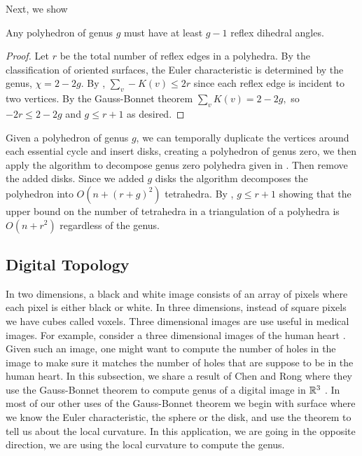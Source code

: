 Next, we show
\begin{theorem}\label{thm:reflex}

Any polyhedron of genus $g$ must have 
at least $g-1$ reflex dihedral angles. 

\end{theorem}
\begin{proof}
Let $r$ be the total number of reflex edges in a polyhedra.
By the classification of oriented surfaces, the Euler characteristic 
 is determined by the genus, $\chi=2-2g$.
By , $\sum_v -K(v)\leq 2 r$ since each
reflex edge is incident to two vertices.
By the Gauss-Bonnet theorem $\sum_vK(v)= 2-2g,$
so $-2r\leq 2-2g$ and $g\leq r+1$ as desired.

\end{proof}

Given a polyhedron of genus $g$, we can temporally 
duplicate the vertices around each essential cycle and insert disks,
 creating a polyhedron of genus zero, we then apply the algorithm to
decompose genus zero polyhedra given in \cite{triangulating-polytope-1990}.
Then remove the added disks.
Since we added $g$ disks the algorithm decomposes
the polyhedron into $O(n+ (r+g)^2)$ tetrahedra.
By , $g\leq r+1$ showing that the upper bound
on the number of tetrahedra in a triangulation
of a polyhedra is $O(n+r^2)$ regardless of the genus.

\subsection{Digital Topology}
\label{sec:digital-topology}

In two dimensions, a black and white image consists of an array of pixels
where each pixel is either black or white.
In three dimensions,
instead of square pixels we have cubes called voxels.
Three dimensional images are use useful in medical images. 
For example, consider a
three dimensional images of the human heart \cite{bovik_handbook_2000}.
Given such an image, one might want to compute
the number of holes in the image to make sure it
matches the number of holes that are suppose to be in
the human heart. In this subsection, we share a result
of Chen and Rong where they 
use the Gauss-Bonnet theorem to 
compute genus of a digital image in $\mathbb{R}^3$ \cite{chen_digital_2010}.
In most of our other uses of the Gauss-Bonnet theorem we begin with surface where we know
the Euler characteristic, the sphere or the disk, and use the theorem to tell us
about the local curvature. In this application, we are going in the opposite direction,
we are using the local curvature to compute the genus.


